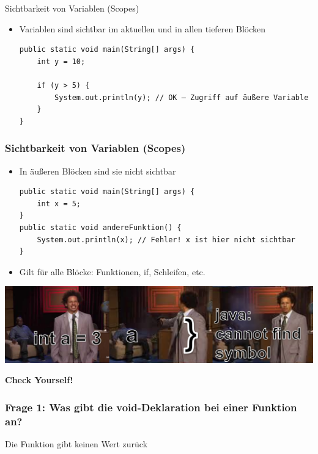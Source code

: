 \documentclass{../../presentation}
\begin{document}
\begin{frame}[fragile]{Sichtbarkeit von Variablen (Scopes)}
	\begin{itemize}
		\item\pause Variablen sind sichtbar im aktuellen und in allen tieferen Blöcken
		      \begin{verbatim}
public static void main(String[] args) {
    int y = 10;

    if (y > 5) {
        System.out.println(y); // OK – Zugriff auf äußere Variable
    }
}
    \end{verbatim}
	\end{itemize}
\end{frame}

\begin{frame}[fragile]
	\frametitle{Sichtbarkeit von Variablen (Scopes)}
	\begin{itemize}
		\item\pause In äußeren Blöcken sind sie nicht sichtbar
		      \begin{verbatim}
public static void main(String[] args) {
    int x = 5;
}
public static void andereFunktion() {
    System.out.println(x); // Fehler! x ist hier nicht sichtbar
}
    \end{verbatim}

		\item\pause Gilt für alle Blöcke: Funktionen, if, Schleifen, etc.
	\end{itemize}
	\includegraphics[width=1\linewidth]{img/scopesmemehoriz.png}
\end{frame}


\begin{frame}[plain]
	\centering
	{\Huge\bfseries{Check Yourself!}}
\end{frame}

\begin{frame}[fragile]
	\frametitle{Frage 1: Was gibt die void-Deklaration bei einer Funktion an?}
	\begin{ausgabe}
		Die Funktion gibt keinen Wert zurück
	\end{ausgabe}
\end{frame}
\end{document}
